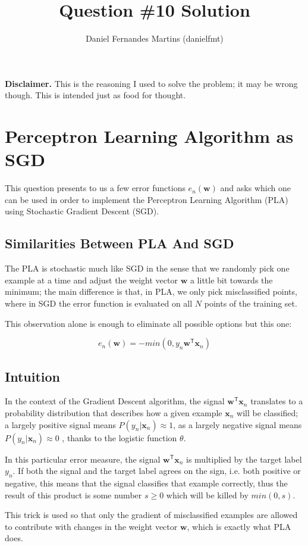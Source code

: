 \documentclass{article}
\author{Daniel Fernandes Martins (danielfmt)}
\title{Question \#10 Solution}
\begin{document}
\maketitle

\textbf{Disclaimer.} This is the reasoning I used to solve the problem; it
may be wrong though. This is intended just as food for thought.

\section{Perceptron Learning Algorithm as SGD}

This question presents to us a few error functions $e_n(\mathbf{w})$ and asks
which one can be used in order to implement the Perceptron Learning Algorithm
(PLA) using Stochastic Gradient Descent (SGD).

\subsection{Similarities Between PLA And SGD}

The PLA is stochastic much like SGD in the sense that we randomly pick one
example at a time and adjust the weight vector $\mathbf{w}$ a little bit towards
the minimum; the main difference is that, in PLA, we only pick misclassified
points, where in SGD the error function is evaluated on all $N$ points of the
training set.

This observation alone is enough to eliminate all possible options but this one:

\begin{equation*}
  e_n(\mathbf{w}) = -min(0, y_n\mathbf{w}^\mathsf{T} \mathbf{x}_n)
\end{equation*}

\subsection{Intuition}

In the context of the Gradient Descent algorithm, the signal
$\mathbf{w}^\mathsf{T}\mathbf{x}_n$ translates to a probability distribution
that describes how a given example $\mathbf{x}_n$ will be classified; a largely
positive signal means $P(y_n | \mathbf{x}_n) \approx 1$, as a largely negative
signal means $P(y_n | \mathbf{x}_n) \approx 0$ , thanks to the logistic function
$\theta$.

In this particular error measure, the signal $\mathbf{w}^\mathsf{T}\mathbf{x}_n$
is multiplied by the target label $y_n$. If both the signal and the target
label agrees on the sign, i.e. both positive or negative, this means that the
signal classifies that example correctly, thus the result of this product is
some number $s \geq 0$ which will be killed by $min(0, s)$.

This trick is used so that only the gradient of misclassified examples are
allowed to contribute with changes in the weight vector $\mathbf{w}$,
which is exactly what PLA does.
\end{document}
